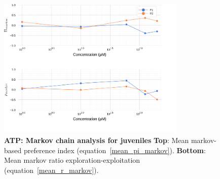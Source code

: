 \begin{appendices}
\begin{figure}[h]
      \label{adenosine_markov}
    \end{figure}
    \begin{figure}[h]
      \centering
      \includegraphics[width=0.8\textwidth]{part_2/assets/atp_markov.png}
      \caption{\textbf{ATP: Markov chain analysis for juveniles} \textbf{Top}: Mean markov-based preference index (equation~\ref{mean_pi_markov}). \textbf{Bottom}: Mean markov ratio exploration-exploitation (equation~\ref{mean_r_markov}).}
      \label{atp_markov}
    \end{figure}


\end{appendices}

